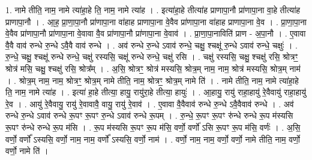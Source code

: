 \documentclass[17pt]{extarticle}
\begin{document}
1. नामे तीति॒ नाम॒ नामे त्या॑हा॒हे ति॒ नाम॒ नामे त्या॑ह । . इत्या॑हा॒हे तीत्या॑ह प्राणापा॒नौ प्रा॑णापा॒ना वा॒हे तीत्या॑ह प्राणापा॒नौ । . आ॒ह॒ प्रा॒णा॒पा॒नौ प्रा॑णापा॒ना वा॑हाह प्राणापा॒ना वे॒वैव प्रा॑णापा॒ना वा॑हाह प्राणापा॒ना वे॒व । . प्रा॒णा॒पा॒ना वे॒वैव प्रा॑णापा॒नौ प्रा॑णापा॒ना वे॒वावा वै॒व प्रा॑णापा॒नौ प्रा॑णापा॒ना वे॒वाव॑ । . प्रा॒णा॒पा॒नाविति॑ प्राण - अ॒पा॒नौ । . ए॒वावा वै॒वै वाव॑ रुन्धे रु॒न्धे ऽवै॒वै वाव॑ रुन्धे । . अव॑ रुन्धे रु॒न्धे ऽवाव॑ रुन्धे॒ चक्षु॒ श्चक्षू॑ रु॒न्धे ऽवाव॑ रुन्धे॒ चक्षुः॑ । . रु॒न्धे॒ चक्षु॒ श्चक्षू॑ रुन्धे रुन्धे॒ चक्षु॑ रस्यसि॒ चक्षू॑ रुन्धे रुन्धे॒ चक्षु॑ रसि । . चक्षु॑ रस्यसि॒ चक्षु॒ श्चक्षु॑ रसि॒ श्रोत्रꣳ॒॒ श्रोत्र॑ मसि॒ चक्षु॒ श्चक्षु॑ रसि॒ श्रोत्र᳚म् । . अ॒सि॒ श्रोत्रꣳ॒॒ श्रोत्र॑ मस्यसि॒ श्रोत्र॒म् नाम॒ नाम॒ श्रोत्र॑ मस्यसि॒ श्रोत्र॒म् नाम॑ । . श्रोत्र॒म् नाम॒ नाम॒ श्रोत्रꣳ॒॒ श्रोत्र॒म् नामे तीति॒ नाम॒ श्रोत्रꣳ॒॒ श्रोत्र॒म् नामे ति॑ । . नामे तीति॒ नाम॒ नामे त्या॑हा॒हे ति॒ नाम॒ नामे त्या॑ह । . इत्या॑ हा॒हे तीत्या॒ हायु॒ रायु॑रा॒हे तीत्या॒ हायुः॑ । . आ॒हायु॒ रायु॑ राहा॒हायु॑ रे॒वैवायु॑ राहा॒हायु॑ रे॒व । . आयु॑ रे॒वैवायु॒ रायु॑ रे॒वावावै॒ वायु॒ रायु॑ रे॒वाव॑ । . ए॒वावा वै॒वैवाव॑ रुन्धे रु॒न्धे ऽवै॒वैवाव॑ रुन्धे । . अव॑ रुन्धे रु॒न्धे ऽवाव॑ रुन्धे रू॒पꣳ रू॒पꣳ रु॒न्धे ऽवाव॑ रुन्धे रू॒पम् । . रु॒न्धे॒ रू॒पꣳ रू॒पꣳ रु॑न्धे रुन्धे रू॒प म॑स्यसि रू॒पꣳ रु॑न्धे रुन्धे रू॒प म॑सि । . रू॒प म॑स्यसि रू॒पꣳ रू॒प म॑सि॒ वर्णो॒ वर्णो॑ ऽसि रू॒पꣳ रू॒प म॑सि॒ वर्णः॑ । . अ॒सि॒ वर्णो॒ वर्णो᳚ ऽस्यसि॒ वर्णो॒ नाम॒ नाम॒ वर्णो᳚ ऽस्यसि॒ वर्णो॒ नाम॑ । . वर्णो॒ नाम॒ नाम॒ वर्णो॒ वर्णो॒ नामे तीति॒ नाम॒ वर्णो॒ वर्णो॒ नामे ति॑ । \newline
\end{document}
